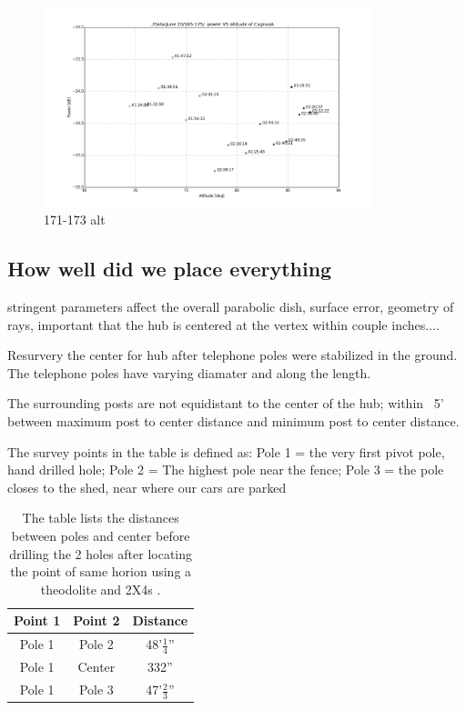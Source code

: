 \documentclass[preprint]{aastex}  %
\begin{document}
\begin{figure}[H]
	\begin{center}
	\includegraphics[width =0.85\textwidth]{spectra_plots/171173altdB}
	\caption{171-173 alt
\label{Fig:171173alt} }
	\end{center}
\end{figure}
\clearpage

\subsection{How well did we place everything}
stringent parameters affect the overall parabolic dish, surface error, geometry of rays, 
important that the hub is centered at the vertex within couple inches....

Resurvery the center for hub after telephone poles were stabilized in the ground. The telephone poles have varying diamater and along the length. 

The surrounding posts are not equidistant to the center of the hub; within ~5' between maximum post to center distance and minimum post to center distance.

The survey points in the table is defined as:
Pole 1 = the very first pivot pole, hand drilled hole; 
Pole 2 = The highest pole near the fence; 
Pole 3 = the pole closes to the shed, near where our cars are parked


\begin{table}[!h]
\centering
\begin{tabular}{|c|c|c|} \hline

Point 1 & Point 2 & Distance \\ \hline
Pole 1 & Pole 2 & 48'$\frac{1}{4}$'' \\ \hline
Pole 1 & Center & 332'' \\ \hline
Pole 1 & Pole 3 & 47'$\frac{2}{3}$'' \\ \hline

\end{tabular}
\caption{The table lists the distances between poles and center before drilling the 2 holes after locating 
the point of same horion using a theodolite and 2X4s \label{Tab:survey_dist_b4_2holes}.}
\end{table}
\end{document}
